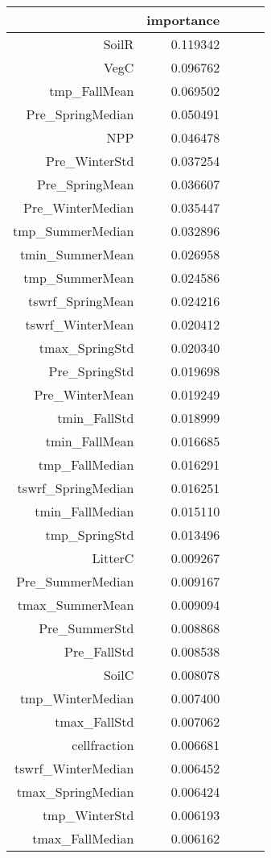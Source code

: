 \begin{table}[h]
\centering
\label{table:5}
\begin{tabular}{rrrrr}
\toprule
 & importance \\
\midrule
SoilR & 0.119342 \\
VegC & 0.096762 \\
tmp_FallMean & 0.069502 \\
Pre_SpringMedian & 0.050491 \\
NPP & 0.046478 \\
Pre_WinterStd & 0.037254 \\
Pre_SpringMean & 0.036607 \\
Pre_WinterMedian & 0.035447 \\
tmp_SummerMedian & 0.032896 \\
tmin_SummerMean & 0.026958 \\
tmp_SummerMean & 0.024586 \\
tswrf_SpringMean & 0.024216 \\
tswrf_WinterMean & 0.020412 \\
tmax_SpringStd & 0.020340 \\
Pre_SpringStd & 0.019698 \\
Pre_WinterMean & 0.019249 \\
tmin_FallStd & 0.018999 \\
tmin_FallMean & 0.016685 \\
tmp_FallMedian & 0.016291 \\
tswrf_SpringMedian & 0.016251 \\
tmin_FallMedian & 0.015110 \\
tmp_SpringStd & 0.013496 \\
LitterC & 0.009267 \\
Pre_SummerMedian & 0.009167 \\
tmax_SummerMean & 0.009094 \\
Pre_SummerStd & 0.008868 \\
Pre_FallStd & 0.008538 \\
SoilC & 0.008078 \\
tmp_WinterMedian & 0.007400 \\
tmax_FallStd & 0.007062 \\
cellfraction & 0.006681 \\
tswrf_WinterMedian & 0.006452 \\
tmax_SpringMedian & 0.006424 \\
tmp_WinterStd & 0.006193 \\
tmax_FallMedian & 0.006162 \\

\end{tabular}
\end{table}
